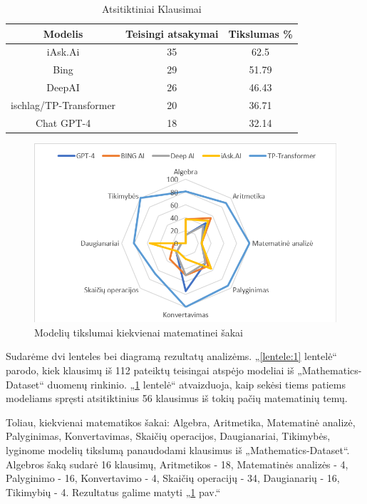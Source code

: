 \documentclass[conference]{IEEEtran}
\begin{document}
\begin{table}[h!]
        \centering
        \caption{Atsitiktiniai Klausimai}
        \label{lentele:2}
        \begin{tabular}{|c c c|} 
        \hline
        Modelis & Teisingi atsakymai & Tikslumas \% \\ [0.5ex] 
        \hline\hline
        iAsk.Ai & 35 & 62.5 \\
        \hline
        Bing & 29 & 51.79 \\
        \hline
        DeepAI & 26 & 46.43 \\
        \hline
        ischlag/TP-Transformer & 20 & 36.71 \\
        \hline
        Chat GPT-4 & 18 & 32.14 \\
        \hline
    \end{tabular}
    \end{table}
\begin{figure}[h!]
    \centering
    \includegraphics[scale=0.5]{lentele.png}
    \caption{Modelių tikslumai kiekvienai matematinei šakai}
    \label{pav:2}
\end{figure}
    
Sudarėme dvi lenteles bei diagramą rezultatų analizėms. „\ref{lentele:1} lentelė“ parodo, kiek klausimų iš 112 pateiktų
teisingai atspėjo modeliai iš „Mathematics-Dataset“ \cite{dataset} duomenų rinkinio. „\ref{lentele:2} lentelė“  atvaizduoja,
kaip sekėsi tiems patiems modeliams spręsti atsitiktinius 56 klausimus iš tokių pačių matematinių temų.



Toliau, kiekvienai matematikos šakai: Algebra, Aritmetika, Matematinė analizė, Palyginimas, Konvertavimas, Skaičių operacijos, Daugianariai, Tikimybės, lyginome modelių tikslumą panaudodami klausimus iš „Mathematics-Dataset“. Algebros šaką sudarė 16 klausimų, Aritmetikos - 18, Matematinės analizės - 4, Palyginimo - 16, Konvertavimo - 4, Skaičių operacijų - 34, Daugianarių - 16, Tikimybių - 4. Rezultatus galime matyti „\ref{pav:2} pav.“
\end{document}
